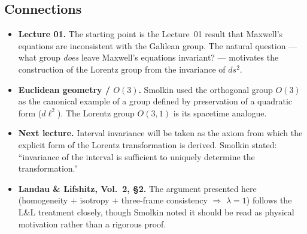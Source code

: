 

\subsection*{Connections}

\begin{itemize}
  \item \textbf{Lecture 01.}  The starting point is the Lecture~01
    result that Maxwell's equations are inconsistent with the Galilean
    group.  The natural question — what group \emph{does} leave
    Maxwell's equations invariant? — motivates the construction of
    the Lorentz group from the invariance of $ds^2$.
  \item \textbf{Euclidean geometry / $O(3)$.}  Smolkin used the
    orthogonal group $O(3)$ as the canonical example of a group
    defined by preservation of a quadratic form ($d\ell^2$).  The
    Lorentz group $O(3,1)$ is its spacetime analogue.
  \item \textbf{Next lecture.}  Interval invariance will be taken as
    the axiom from which the explicit form of the Lorentz
    transformation is derived.  Smolkin stated: ``invariance of the
    interval is sufficient to uniquely determine the transformation.''
  \item \textbf{Landau \& Lifshitz, Vol.~2, §2.}  The argument
    presented here (homogeneity $+$ isotropy $+$ three-frame
    consistency $\Rightarrow$ $\lambda = 1$) follows the L\&L
    treatment closely, though Smolkin noted it should be read as
    physical motivation rather than a rigorous proof.
\end{itemize}

